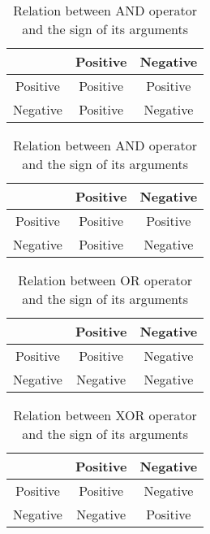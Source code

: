 \documentclass[a4paper,draft,12pt]{book}
\begin{document}
\begin{table}[h]
\begin{center}
\begin{tabular}[h]{ccc}
\hline
         & Positive & Negative\\
\hline
Positive & Positive & Positive\\
Negative & Positive & Negative\\
\hline
\end{tabular}
\caption{Relation between AND operator and the sign of its arguments}
\label{ARGBOOLSIGN1}
\end{center}
\end{table}

\begin{table}[h]
\begin{center}
\begin{tabular}[h]{ccc}
\hline
         & Positive & Negative\\
\hline
Positive & Positive & Positive\\
Negative & Positive & Negative\\
\hline
\end{tabular}
\caption{Relation between AND operator and the sign of its arguments}
\label{ARGBOOLSIGN1}
\end{center}
\end{table}

\begin{table}[h]
\begin{center}
\begin{tabular}[h]{ccc}
\hline
         & Positive & Negative\\
\hline
Positive & Positive & Negative\\
Negative & Negative & Negative\\
\hline
\end{tabular}
\caption{Relation between OR operator and the sign of its arguments}
\label{ARGBOOLSIGN2}
\end{center}
\end{table}

\begin{table}[h]
\begin{center}
\begin{tabular}[h]{ccc}
\hline
         & Positive & Negative\\
\hline
Positive & Positive & Negative\\
Negative & Negative & Positive\\
\hline
\end{tabular}
\caption{Relation between XOR operator and the sign of its arguments}
\label{ARGBOOLSIGN3}
\end{center}
\end{table}
\end{document}
